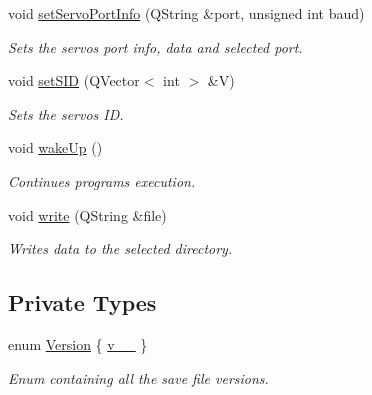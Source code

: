 \begin{DoxyCompactItemize}
void \hyperlink{class_servo_thread_a76af3e89d1a8705426584bedb0624909}{set\+Servo\+Port\+Info} (Q\+String \&port, unsigned int baud)
\begin{DoxyCompactList}\small\item\em Sets the servos port info, data and selected port. \end{DoxyCompactList}\item 
void \hyperlink{class_servo_thread_ac3471e5020f5d9babd3f2ff7b3b82aca}{set\+S\+I\+D} (Q\+Vector$<$ int $>$ \&V)
\begin{DoxyCompactList}\small\item\em Sets the servos I\+D. \end{DoxyCompactList}\item 
void \hyperlink{class_servo_thread_a5f32574f843d76deffec45995028389b}{wake\+Up} ()
\begin{DoxyCompactList}\small\item\em Continues program\textquotesingle{}s execution. \end{DoxyCompactList}\item 
void \hyperlink{class_servo_thread_ae5753b8c12768d2115ff900f0ab8e13c}{write} (Q\+String \&file)
\begin{DoxyCompactList}\small\item\em Writes data to the selected directory. \end{DoxyCompactList}\end{DoxyCompactItemize}
\subsection*{Private Types}
\begin{DoxyCompactItemize}
\item 
enum \hyperlink{class_servo_thread_aeccce0ac6a969e2ee7cbe91687e2d085}{Version} \{ \hyperlink{class_servo_thread_aeccce0ac6a969e2ee7cbe91687e2d085a319b6bf2cb120faeefbd0a5118ece7e3}{v\+\_\+\_}
 \}
\begin{DoxyCompactList}\small\item\em Enum containing all the save file versions. \end{DoxyCompactList}\end{DoxyCompactItemize}
